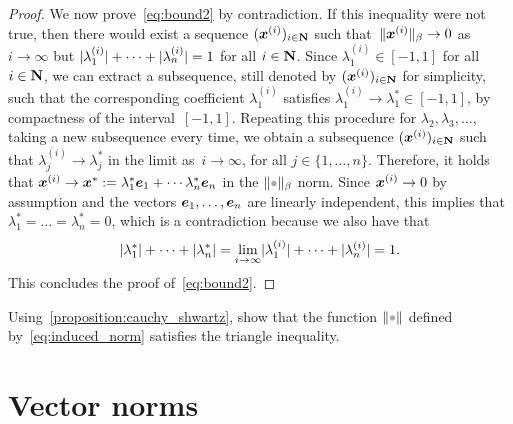 \begin{proof}
    We now prove~\eqref{eq:bound2} by contradiction.
    If this inequality were not true,
    then there would exist a sequence $(\mathbf{\boldsymbol{x}}^{(i)})_{i \in \mathbf N}$ such
    that~$\lVert\mathbf{\boldsymbol{x}}^{(i)}\rVert_{\beta} \to 0$ as $i \to \infty$ but $\lvert\lambda_1^{(i)}\rvert + \dotsb + \lvert\lambda_n^{(i)}\rvert = 1$ for all $i \in \mathbf N$.
    Since $\lambda_1^{(i)} \in [-1, 1]$ for all $i \in \mathbf N$,
    we can extract a subsequence, still denoted by $(\mathbf{\boldsymbol{x}}^{(i)})_{i \in \mathbf N}$ for simplicity,
    such that the corresponding coefficient $\lambda_1^{(i)}$ satisfies $\lambda_1^{(i)} \to \lambda_1^* \in [-1, 1]$,
    by compactness of the interval~$[-1, 1]$.
    Repeating this procedure for $\lambda_2, \lambda_3, \dots$,
    taking a new subsequence every time,
    we obtain a subsequence $(\mathbf{\boldsymbol{x}}^{(i)})_{i \in \mathbf N}$ such that $\lambda^{(i)}_j \to \lambda_j^*$ in the limit as~$i \to \infty$, for all $j \in \{1, \dotsc, n\}$.
    Therefore, it holds that $\mathbf{\boldsymbol{x}}^{(i)} \to \mathbf{\boldsymbol{x}}^* := \lambda_1^* \mathbf{\boldsymbol{e}}_1 + \dotsb \lambda_n^* \mathbf{\boldsymbol{e}}_n$ in the $\norm{\placeholder}_{\beta}$ norm.
    Since $\mathbf{\boldsymbol{x}}^{(i)} \to 0$ by assumption and the vectors $\mathbf{\boldsymbol{e}}_1, \dotsc, \mathbf{\boldsymbol{e}}_n$ are linearly independent,
    this implies that $\lambda_1^* = \dots = \lambda_n^* = 0$,
    which is a contradiction because we also have that
    \[
        \lvert\lambda_1^*\rvert + \dotsb + \lvert\lambda_n^*\rvert = \lim_{i \to \infty} \lvert\lambda_1^{(i)}\rvert + \dotsb + \lvert\lambda_n^{(i)}\rvert = 1.
    \]
    This concludes the proof of~\eqref{eq:bound2}.
\end{proof}

\begin{exercise}
    Using~\cref{proposition:cauchy_shwartz},
    show that the function $\norm{\placeholder}$ defined by~\eqref{eq:induced_norm} satisfies the triangle inequality.
\end{exercise}

\section{Vector norms}%
\label{sub:vector_norms}


